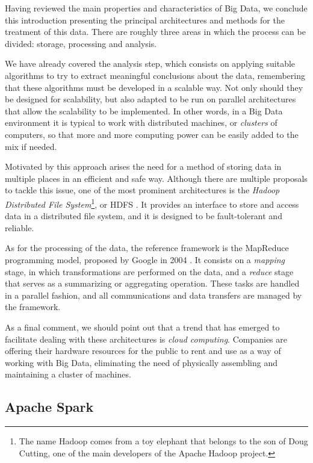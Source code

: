 Having reviewed the main properties and characteristics of Big Data, we conclude this introduction presenting the principal architectures and methods for the treatment of this data. There are roughly three areas in which the process can be divided: storage, processing and analysis.

We have already covered the analysis step, which consists on applying suitable algorithms to try to extract meaningful conclusions about the data, remembering that these algorithms must be developed in a scalable way. Not only should they be designed for scalability, but also adapted to be run on parallel architectures that allow the scalability to be implemented. In other words, in a Big Data environment it is typical to work with distributed machines, or \textit{clusters} of computers, so that more and more computing power can be easily added to the mix if needed.

Motivated by this approach arises the need for a method of storing data in multiple places in an efficient and safe way. Although there are multiple proposals to tackle this issue, one of the most prominent architectures is the \textit{Hadoop Distributed File System}\footnote{The name Hadoop comes from a toy elephant that belongs to the son of Doug Cutting, one of the main developers of the Apache Hadoop project.}, or HDFS \cite{chansler2010hdfs}. It provides an interface to store and access data in a distributed file system, and it is designed to be fault-tolerant and reliable.

As for the processing of the data, the reference framework is the MapReduce programming model, proposed by Google in 2004 \cite{dean2004mapreduce}. It consists on a \textit{mapping} stage, in which transformations are performed on the data, and a \textit{reduce} stage that serves as a summarizing or aggregating operation. These tasks are handled in a parallel fashion, and all communications and data transfers are managed by the framework.

As a final comment, we should point out that a trend that has emerged to facilitate dealing with these architectures is \textit{cloud computing}. Companies are offering their hardware resources for the public to rent and use as a way of working with Big Data, eliminating the need of physically assembling and maintaining a cluster of machines.

\subsection{Apache Spark}

